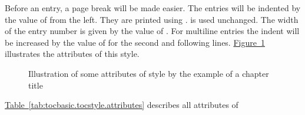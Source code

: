 \begin{description}
  Before an entry, a page break will be made easier. The entries will be
  indented by the value of  from the left. They are printed
  using .  is used
  unchanged. The width of the entry number is given by the value of
  . For multiline entries the indent will be increased by the
  value of  for the second and following
  lines. \hyperref[fig:tocbasic.undottedtocline]%
  {Figure~\ref*{fig:tocbasic.undottedtocline}} illustrates the attributes of
  this style.
  \begin{figure}
    \centering
    \caption{Illustration of some attributes of style 
      by the example of a chapter title}%
    \label{fig:tocbasic.undottedtocline}
  \end{figure}
\end{description}
\hyperref[tab:tocbasic.tocstyle.attributes]%
{Table~\ref*{tab:tocbasic.tocstyle.attributes}} describes all attributes of
